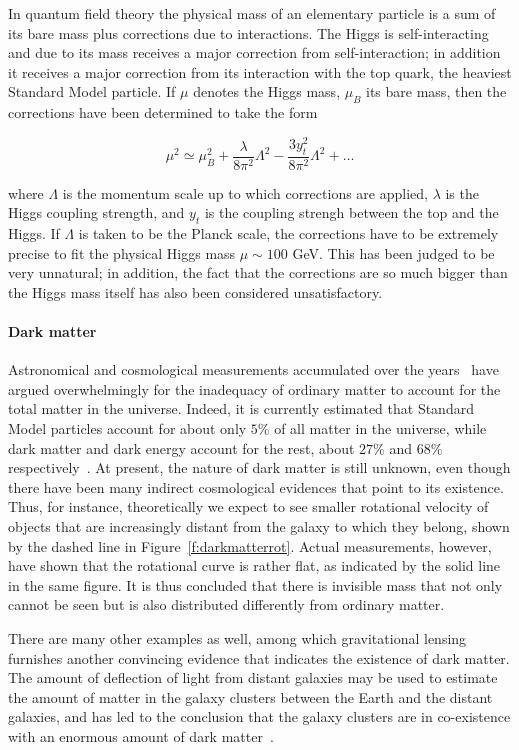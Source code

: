In quantum field theory the physical mass of an elementary particle is a sum of
its bare mass plus corrections due to interactions. The Higgs is
self-interacting and due to its mass receives a major correction from
self-interaction; in addition it receives a major correction from its
interaction with the top quark, the heaviest Standard Model particle. If $\mu$
denotes the Higgs mass, $\mu_B$ its bare mass, then the corrections have been
determined to take the form

$$\mu^2  \simeq \mu_{B}^2 +  \frac{\lambda}{8\pi^2}\Lambda^2 -
	\frac{3y_t^2}{8\pi^2}\Lambda^2 + \dots $$

where $\Lambda$ is the momentum scale up to which corrections are applied,
$\lambda$ is the Higgs coupling strength, and $y_t$ is the coupling strengh
between the top and the Higgs. If $\Lambda$ is taken to be the Planck scale,
the corrections have to be extremely precise to fit the physical Higgs mass
$\mu \sim 100$ GeV. This has been judged to be very unnatural; in addition, the
fact that the corrections are so much bigger than the Higgs mass itself has
also been considered unsatisfactory.


\paragraph{Dark matter} Astronomical and cosmological measurements accumulated
over the years~\cite{darkmt01, darkmt02, darkmt03, darkmt04} have argued
overwhelmingly for the inadequacy of ordinary matter to account for the total
matter in the universe. Indeed, it is currently estimated that Standard Model
particles account for about only $5\%$ of all matter in the universe, while
dark matter and dark energy account for the rest, about $27\%$ and $68\%$
respectively~\cite{darkmt05, darkmt06}. At present, the nature of dark matter
is still unknown, even though there have been many indirect cosmological
evidences that point to its existence. Thus, for instance, theoretically we
expect to see smaller rotational velocity of objects that are increasingly
distant from the galaxy to which they belong, shown by the dashed line in
Figure~\ref{f:darkmatterrot}. Actual measurements, however, have shown that the
rotational curve is rather flat, as indicated by the solid line in the same
figure. It is thus concluded that there is invisible mass that not only cannot
be seen but is also distributed differently from ordinary matter.

There are many other examples as well, among which gravitational lensing
furnishes another convincing evidence that indicates the existence of dark
matter. The amount of deflection of light from distant galaxies may be used to
estimate the amount of matter in the galaxy clusters between the Earth and the
distant galaxies, and has led to the conclusion that the galaxy clusters are in
co-existence with an enormous amount of dark matter~\cite{darkmt01, darkmt02,
	darkmt03, darkmt04, darkmt05, darkmt06}.


